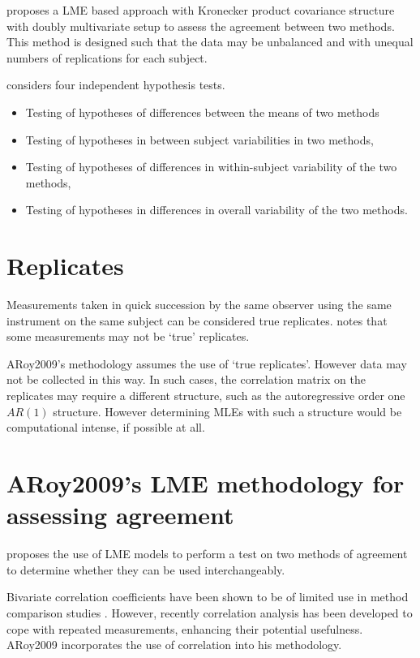 \documentclass[12pt, a4paper]{report}
\theoremstyle{plain}
\theoremstyle{definition}
\theoremstyle{remark}
\begin{document}
	\citet{AARoy20092009} proposes a LME based approach with Kronecker
	product covariance structure with doubly multivariate setup to
	assess the agreement between two methods. This method is designed
	such that the data may be unbalanced and with unequal numbers of
	replications for each subject.
	
	\citet{AARoy20092009} considers four independent hypothesis tests.
	\begin{itemize}
		\item Testing of hypotheses of differences between the means of
		two methods\item Testing of hypotheses in between subject
		variabilities in two methods, \item Testing of hypotheses of
		differences in within-subject variability of the two methods,
		\item Testing of hypotheses in differences in overall variability
		of the two methods.
	\end{itemize}
	
	
	\section{Replicates}
	Measurements taken in quick succession by the same observer using the same instrument on the same subject can be considered true replicates. \citet{ARoy20092009} notes that some measurements may not be `true' replicates.
	
	ARoy2009's methodology assumes the use of `true replicates'. However data may not be collected in this way. In such cases, the correlation matrix on the replicates may require a different structure, such as the autoregressive order one $AR(1)$ structure. However determining MLEs with such a structure would be computational intense, if possible at all.
	
	\section{ARoy2009's LME methodology for assessing agreement}
	
	\citet{AARoy20092009} proposes the use of LME models to perform a test on two methods of agreement to determine whether they can be used
	interchangeably.
	
	Bivariate correlation coefficients have been shown to be of limited use in method comparison studies \citep{BA86}. However,
	recently correlation analysis has been developed to cope with
	repeated measurements, enhancing their potential usefulness. ARoy2009
	incorporates the use of correlation into his methodology.
	
\end{document}
